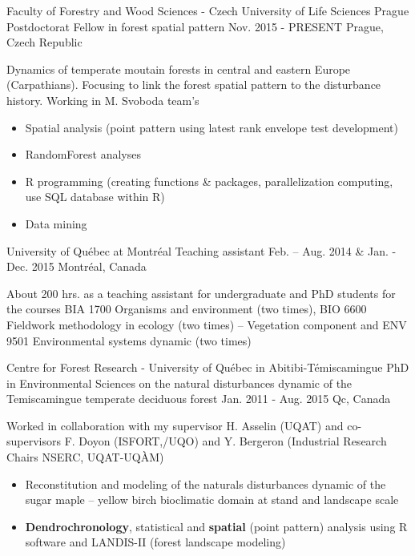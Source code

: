 \vspace{-8pt}
\begin{cventries}
  \cventry
  {Faculty of Forestry and Wood Sciences - Czech University of Life Sciences Prague}
  {Postdoctorat Fellow in forest spatial pattern}
  {Nov. 2015 - PRESENT}
    {Prague, Czech Republic}
{
    \begin{cvitems}
    \item []{\textnormal{Dynamics of temperate moutain forests in
          central and eastern Europe (Carpathians). Focusing to link
          the forest spatial pattern to the disturbance
          history. Working in M. Svoboda team's}}
      \begin{itemize}[label=$\bullet$,topsep=2pt]
      \item {Spatial analysis (point pattern using latest rank
          envelope test development)}
    \item {RandomForest analyses}
    \item {R programming (creating functions \& packages,
        parallelization computing, use SQL database within R)}
    \item {Data mining}
      \end{itemize}
      \end{cvitems}
    }

\vspace{-3pt}
    \cventry
  {University of Québec at Montréal}
  {Teaching assistant}
  {Feb. – Aug. 2014 \& Jan. - Dec. 2015}
    {Montréal, Canada}
{
    \begin{cvitems}
    \item []{\textnormal{About 200 hrs. as a teaching assistant for undergraduate and PhD
          students for the courses BIA 1700 Organisms and environment
          (two times), BIO 6600 Fieldwork methodology in ecology (two
          times) – Vegetation component and ENV 9501 Environmental
          systems dynamic (two times)}}
    \end{cvitems}
  }


  \cventry
  {Centre for Forest Research - University of Québec in Abitibi-Témiscamingue}
  {PhD in Environmental Sciences on the natural disturbances dynamic
    of the Temiscamingue temperate deciduous forest}
  {Jan. 2011 - Aug. 2015}
    {Qc, Canada}
    {
      \begin{cvitems}
      \item []{\textnormal{Worked in collaboration with my supervisor
             H. Asselin (UQAT) and co-supervisors F.
            Doyon (ISFORT,/UQO) and Y. Bergeron (Industrial Research Chairs NSERC, UQAT-UQÀM)}}
      \begin{itemize}[label=$\bullet$,topsep=2pt]
        \item {Reconstitution and modeling of the naturals disturbances dynamic of the sugar maple – yellow birch bioclimatic domain at stand and landscape scale}
        \item {\textbf{Dendrochronology}, statistical and \textbf{spatial} (point
            pattern) analysis using R software and LANDIS-II (forest landscape
            modeling)}
      \end{itemize}
      \end{cvitems} 
    }



\end{cventries}
